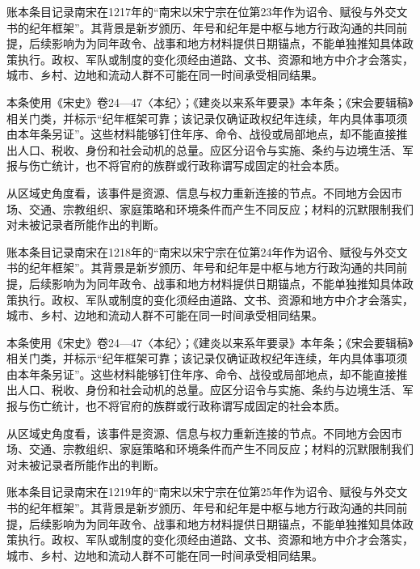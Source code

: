 账本条目记录南宋在1217年的“南宋以宋宁宗在位第23年作为诏令、赋役与外交文书的纪年框架”。其背景是新岁颁历、年号和纪年是中枢与地方行政沟通的共同前提，后续影响为为同年政令、战事和地方材料提供日期锚点，不能单独推知具体政策执行。政权、军队或制度的变化须经由道路、文书、资源和地方中介才会落实，城市、乡村、边地和流动人群不可能在同一时间承受相同结果。

本条使用《宋史》卷24—47〈本纪〉；《建炎以来系年要录》本年条；《宋会要辑稿》相关门类，并标示“纪年框架可靠；该记录仅确证政权纪年连续，年内具体事项须由本年条另证”。这些材料能够钉住年序、命令、战役或局部地点，却不能直接推出人口、税收、身份和社会动机的总量。应区分诏令与实施、条约与边境生活、军报与伤亡统计，也不将官府的族群或行政称谓写成固定的社会本质。

从区域史角度看，该事件是资源、信息与权力重新连接的节点。不同地方会因市场、交通、宗教组织、家庭策略和环境条件而产生不同反应；材料的沉默限制我们对未被记录者所能作出的判断。

账本条目记录南宋在1218年的“南宋以宋宁宗在位第24年作为诏令、赋役与外交文书的纪年框架”。其背景是新岁颁历、年号和纪年是中枢与地方行政沟通的共同前提，后续影响为为同年政令、战事和地方材料提供日期锚点，不能单独推知具体政策执行。政权、军队或制度的变化须经由道路、文书、资源和地方中介才会落实，城市、乡村、边地和流动人群不可能在同一时间承受相同结果。

本条使用《宋史》卷24—47〈本纪〉；《建炎以来系年要录》本年条；《宋会要辑稿》相关门类，并标示“纪年框架可靠；该记录仅确证政权纪年连续，年内具体事项须由本年条另证”。这些材料能够钉住年序、命令、战役或局部地点，却不能直接推出人口、税收、身份和社会动机的总量。应区分诏令与实施、条约与边境生活、军报与伤亡统计，也不将官府的族群或行政称谓写成固定的社会本质。

从区域史角度看，该事件是资源、信息与权力重新连接的节点。不同地方会因市场、交通、宗教组织、家庭策略和环境条件而产生不同反应；材料的沉默限制我们对未被记录者所能作出的判断。

账本条目记录南宋在1219年的“南宋以宋宁宗在位第25年作为诏令、赋役与外交文书的纪年框架”。其背景是新岁颁历、年号和纪年是中枢与地方行政沟通的共同前提，后续影响为为同年政令、战事和地方材料提供日期锚点，不能单独推知具体政策执行。政权、军队或制度的变化须经由道路、文书、资源和地方中介才会落实，城市、乡村、边地和流动人群不可能在同一时间承受相同结果。

